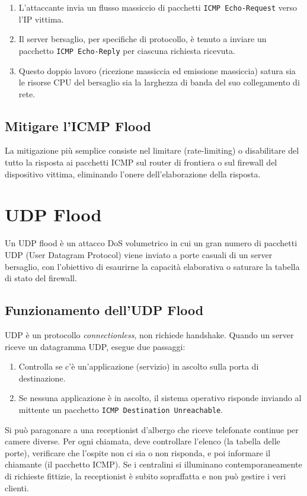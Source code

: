 \begin{enumerate}
    \item L'attaccante invia un flusso massiccio di pacchetti \texttt{ICMP Echo-Request} verso l'IP vittima.
    \item Il server bersaglio, per specifiche di protocollo, è tenuto a inviare un pacchetto \texttt{ICMP Echo-Reply} per ciascuna richiesta ricevuta.
    \item Questo doppio lavoro (ricezione massiccia ed emissione massiccia) satura sia le risorse CPU del bersaglio sia la larghezza di banda del suo collegamento di rete.
\end{enumerate}

\subsection{Mitigare l'ICMP Flood}
La mitigazione più semplice consiste nel limitare (rate-limiting) o disabilitare del tutto la risposta ai pacchetti ICMP sul router di frontiera o sul firewall del dispositivo vittima, eliminando l'onere dell'elaborazione della risposta.

\section{UDP Flood}

Un UDP flood è un attacco DoS volumetrico in cui un gran numero di pacchetti UDP (User Datagram Protocol) viene inviato a porte casuali di un server bersaglio, con l'obiettivo di esaurirne la capacità elaborativa o saturare la tabella di stato del firewall.

\subsection{Funzionamento dell'UDP Flood}
UDP è un protocollo \textit{connectionless}, non richiede handshake. Quando un server riceve un datagramma UDP, esegue due passaggi:
\begin{enumerate}
    \item Controlla se c'è un'applicazione (servizio) in ascolto sulla porta di destinazione.
    \item Se nessuna applicazione è in ascolto, il sistema operativo risponde inviando al mittente un pacchetto \texttt{ICMP Destination Unreachable}.
\end{enumerate}

\begin{exbox}
Si può paragonare a una receptionist d'albergo che riceve telefonate continue per camere diverse. Per ogni chiamata, deve controllare l'elenco (la tabella delle porte), verificare che l'ospite non ci sia o non risponda, e poi informare il chiamante (il pacchetto ICMP). Se i centralini si illuminano contemporaneamente di richieste fittizie, la receptionist è subito sopraffatta e non può gestire i veri clienti.
\end{exbox}

